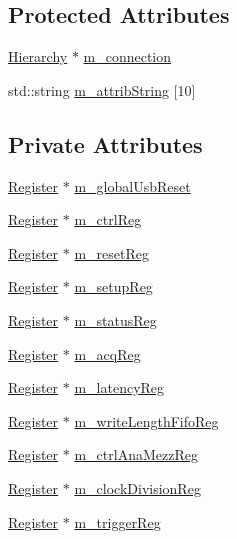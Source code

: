 \subsection*{Protected Attributes}
\begin{DoxyCompactItemize}
\item 
\hyperlink{classHierarchy}{Hierarchy} $\ast$ \hyperlink{classElement_abe3de7a5dbbc9a6dd2d7e012e5fdb266}{m\_\-connection}
\item 
std::string \hyperlink{classAttrib_a3414521d7a82476e874b25a5407b5e63}{m\_\-attribString} \mbox{[}10\mbox{]}
\end{DoxyCompactItemize}
\subsection*{Private Attributes}
\begin{DoxyCompactItemize}
\item 
\hyperlink{classRegister}{Register} $\ast$ \hyperlink{classA3PE_abd71e0c273f9e211e1a9302019129aff}{m\_\-globalUsbReset}
\item 
\hyperlink{classRegister}{Register} $\ast$ \hyperlink{classA3PE_a264834484dd6326ebad58c2a3e1be9a6}{m\_\-ctrlReg}
\item 
\hyperlink{classRegister}{Register} $\ast$ \hyperlink{classA3PE_ab4db5f00976e5095686f108c8febf702}{m\_\-resetReg}
\item 
\hyperlink{classRegister}{Register} $\ast$ \hyperlink{classA3PE_a142fa10b7e705c4701ae21678ec2ec8a}{m\_\-setupReg}
\item 
\hyperlink{classRegister}{Register} $\ast$ \hyperlink{classA3PE_a2281e3d12a2dffad99ec55be2b695f53}{m\_\-statusReg}
\item 
\hyperlink{classRegister}{Register} $\ast$ \hyperlink{classA3PE_abaf426f4c9192537117b77f9f4821e04}{m\_\-acqReg}
\item 
\hyperlink{classRegister}{Register} $\ast$ \hyperlink{classA3PE_a96a167e73e264da5a18d9ddb5ebb5f23}{m\_\-latencyReg}
\item 
\hyperlink{classRegister}{Register} $\ast$ \hyperlink{classA3PE_a9a0cb2253ea34c0be567a03684217fee}{m\_\-writeLengthFifoReg}
\item 
\hyperlink{classRegister}{Register} $\ast$ \hyperlink{classA3PE_a126a936a5fd4fd4b83485b3637e1fa84}{m\_\-ctrlAnaMezzReg}
\item 
\hyperlink{classRegister}{Register} $\ast$ \hyperlink{classA3PE_ae1f4c24a99c2e6ae944a080f429cc155}{m\_\-clockDivisionReg}
\item 
\hyperlink{classRegister}{Register} $\ast$ \hyperlink{classA3PE_a750158ae488121ab7969452f061e678c}{m\_\-triggerReg}

\end{DoxyCompactItemize}
